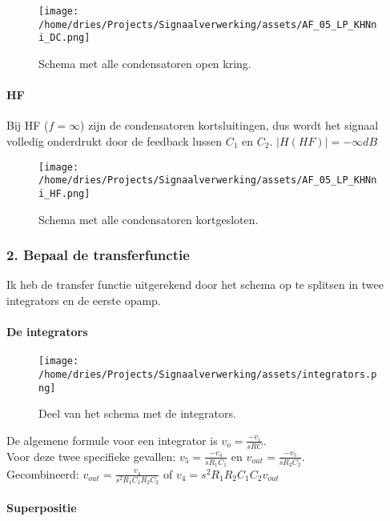 \documentclass[]{article}
\let\oldparagraph\paragraph
\renewcommand{\paragraph}[1]{\oldparagraph{#1}\mbox{}}
\begin{document}
\begin{figure}
\centering
\texttt{[image: /home/dries/Projects/Signaalverwerking/assets/AF\_05\_LP\_KHNni\_DC.png]}
\caption{Schema met alle condensatoren open kring.}
\end{figure}

\hypertarget{header-n5327}{%
\paragraph{HF}\label{header-n5327}}

Bij HF (\(f=\infty\)) zijn de condensatoren kortsluitingen, dus wordt
het signaal volledig onderdrukt door de feedback lussen \(C_1\) en
\(C_2\). \(|H(HF)| = -\infty dB\)

\begin{figure}
\centering
\texttt{[image: /home/dries/Projects/Signaalverwerking/assets/AF\_05\_LP\_KHNni\_HF.png]}
\caption{Schema met alle condensatoren kortgesloten.}
\end{figure}

\hypertarget{header-n5332}{%
\subsubsection{2. Bepaal de transferfunctie}\label{header-n5332}}

Ik heb de transfer functie uitgerekend door het schema op te splitsen in
twee integrators en de eerste opamp.

\hypertarget{header-n5335}{%
\paragraph{De integrators}\label{header-n5335}}

\begin{figure}
\centering
\texttt{[image: /home/dries/Projects/Signaalverwerking/assets/integrators.png]}
\caption{Deel van het schema met de integrators.}
\end{figure}

De algemene formule voor een integrator is \(v_o=\frac{-v_1}{sRC}\).\\
Voor deze twee specifieke gevallen: \(v_5=\frac{-v_4}{sR_1C_1}\) en
\(v_{out} = \frac{-v_5}{sR_2C_2}\).\\
Gecombineerd: \(v_{out}=\frac{v_4}{s^2R_1C_1R_2C_2} \) of
\(v_4 = s^2R_1R_2C_1C_2v_{out}\)

\hypertarget{header-n5342}{%
\paragraph{Superpositie}\label{header-n5342}}
\end{document}
